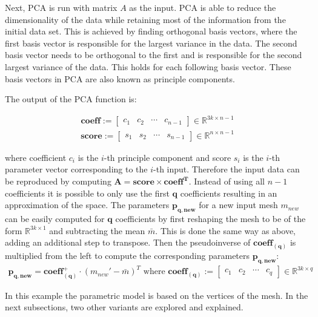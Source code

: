 Next, PCA is run with matrix $A$ as the input. PCA is able to reduce the dimensionality of the data while retaining most of the information from the initial data set. This is achieved by finding orthogonal basis vectors, where the first basis vector is responsible for the largest variance in the data. The second basis vector needs to be orthogonal to the first and is responsible for the second largest variance of the data. This holds for each following basis vector. These basis vectors in PCA are also known as principle components.

The output of the PCA function is:

\begin{gather}
\mathbf{coeff} :=
\begin{bmatrix}
 c_1&c_2&\cdots&c_{n-1}
\end{bmatrix}
\in \mathbb{R}^{3k \times n-1}
\end{gather}
\begin{gather}
\mathbf{score} :=
\begin{bmatrix}
s_1&s_2&\cdots&s_{n-1}
\end{bmatrix}
\in \mathbb{R}^{n \times n-1}
\end{gather}

where coefficient $c_i$ is the $i$-th principle component and score $s_i$ is the $i$-th parameter vector corresponding to the $i$-th input. Therefore the input data can be reproduced by computing $\mathbf{A = score \times {coeff}^T}$. Instead of using all $n-1$ coefficients it is possible to only use the first $\mathbf{q}$ coefficients resulting in an approximation of the space. The parameters $\mathbf{p_{q,new}}$ for a new input mesh $m_{new}$ can be easily computed for $\mathbf{q}$ coefficients by first reshaping the mesh to be of the form $\mathbb{R}^{3k \times 1}$ and subtracting the mean $\bar{m}$. This is done the same way as above, adding an additional step to transpose. Then the pseudoinverse of $\mathbf{coeff_{(q)}}$ is multiplied from the left to compute the corresponding parameters $\mathbf{p_{q,new}}$:
\begin{gather}
\mathbf{p_{q,new}} = \mathbf{coeff^+_{(q)}} \cdot (m_{new}' - \bar{m})^T  \text{  where }
\mathbf{coeff_{(q)}} :=
\begin{bmatrix}
 c_1&c_2&\cdots&c_{q}
\end{bmatrix}
\in \mathbb{R}^{3k \times q}
\end{gather}

In this example the parametric model is based on the vertices of the mesh. In the next subsections, two other variants are explored and explained.
